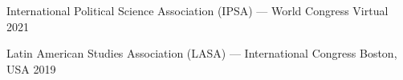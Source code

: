 \begin{cvhonors}
\cvconf
{International Political Science Association (IPSA) --- World Congress} 
{Virtual}
{2021}
\end{cvhonors}

\begin{cvhonors}
\cvconf
{Latin American Studies Association (LASA) --- International Congress} 
{Boston, USA}
{2019}
\end{cvhonors}










